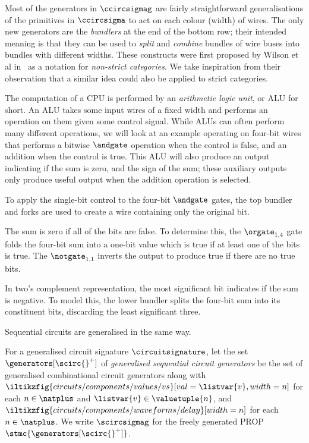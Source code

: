 \documentclass{lmcs}
\begin{document}
Most of the generators  in \(\ccircsigmag\) are fairly straightforward
generalisations of the primitives in \(\ccircsigma\) to act on each
colour (width) of wires.
The only new generators are the \emph{bundlers} at the end of the bottom row;
their intended meaning is that they can be used to \emph{split} and
\emph{combine} bundles of wire buses into bundles with different widths.
These constructs were first proposed by Wilson et al in~\cite{wilson2023string}
as a notation for \emph{non-strict categories}.
We take inspiration from their observation that a similar idea could also be
applied to strict categories.

\begin{exa}[ALU]
    The computation of a CPU is performed by an \emph{arithmetic logic unit},
    or ALU for short.
    An ALU takes some input wires of a fixed width and performs an operation
    on them given some control signal.
    While ALUs can often perform many different operations, we will look at an
    example operating on four-bit wires that performs a bitwise \(\andgate\)
    operation when the control is false, and an addition when the control is
    true.
    This ALU will also produce an output indicating if the sum is zero, and
    the sign of the sum; these auxiliary outputs only produce useful output when
    the addition operation is selected.

    \begin{center}
    \end{center}

    To apply the single-bit control to the four-bit \(\andgate\) gates, the
    top bundler and forks are used to create a wire containing only the
    original bit.

    The sum is zero if all of the bits are false.
    To determine this, the \(\orgate_{1,4}\) gate folds the four-bit sum into
    a one-bit value which is true if at least one of the bits is true.
    The \(\notgate_{1,1}\) inverts the output to produce true if there are no
    true bits.

    In two's complement representation, the most significant bit indicates if
    the sum is negative.
    To model this, the lower bundler splits the four-bit sum into its
    constituent bits, discarding the least significant three.
\end{exa}

Sequential circuits are generalised in the same way.

\begin{defi}
    For a generalised circuit signature \(\circuitsignature\), let the set
    \(\generators[\scirc{}^+]\) of
    \emph{generalised sequential circuit generators} be the set of
    generalised combinational circuit generators along with
    \(
    \iltikzfig{circuits/components/values/vs}[val=\listvar{v},width=n]
    \) for each \(n \in \natplus\) and \(\listvar{v} \in \valuetuple{n}\), and
    \(
    \iltikzfig{circuits/components/waveforms/delay}[width=n]
    \) for each \(n \in \natplus\).
    We write \(\scircsigmag\) for the freely generated PROP
    \(\stmc{\generators[\scirc{}^+]}\).
\end{defi}
\end{document}
